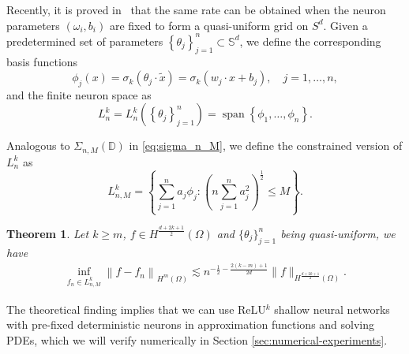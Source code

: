 \documentclass{article}
\def\SS{\mathbb{S}}
\newtheorem{theorem}{Theorem}
\newtheorem{definition}{Definition}
\theoremstyle{remark}
\begin{document}
Recently, it is proved in~\cite{LMX2025} that the same rate can be obtained when the neuron parameters $(\omega_i,b_i)$ are fixed to form a quasi-uniform grid on $S^d$.
Given a predetermined set of parameters $\left\{\theta_j\right\}_{j=1}^n \subset \mathbb{S}^d$, we define the corresponding basis functions
$$
\phi_j(x)=\sigma_k\left(\theta_j \cdot \tilde{x}\right)=\sigma_k\left(w_j \cdot x+b_j\right), \quad j=1, \ldots, n, 
$$
and the finite neuron space as
$$
L_n^k=L_n^k\left(\left\{\theta_j\right\}_{j=1}^n\right)=\operatorname{span}\left\{\phi_1, \ldots, \phi_n\right\}. 
$$

Analogous to $\Sigma_{n, M}(\mathbb{D})$ in \eqref{eq:sigma_n_M}, we define the constrained version of $L_n^k$ as
$$
L_{n, M}^k=\left\{\sum_{j=1}^n a_j \phi_j:\left(n \sum_{j=1}^n a_j^2\right)^{\frac{1}{2}} \leq M\right\}.
$$




\begin{theorem}{\cite{LMX2025}}\label{thm:lfns}
 Let $k \geq m$, $f \in H^{\frac{d+2 k+1}{2}}(\Omega)$ and $\{\theta_j\}_{j=1}^n$ being quasi-uniform, we have 
 \begin{equation}
\begin{aligned}
\inf _{f_n \in L_{n, M}^k}\left\|f-f_n\right\|_{H^m(\Omega)} \lesssim n^{-\frac{1}{2}-\frac{2 (k-m)+1}{2 d}}\|f\|_{ H^{\frac{d+2 k+1}{2}}(\Omega)}.
\end{aligned}
\end{equation}    
\end{theorem}
The theoretical finding implies that we can use ReLU$^k$ shallow neural networks with pre-fixed deterministic neurons in approximation functions and solving PDEs, which we will verify numerically in Section \ref{sec:numerical-experiments}. 
\end{document}
